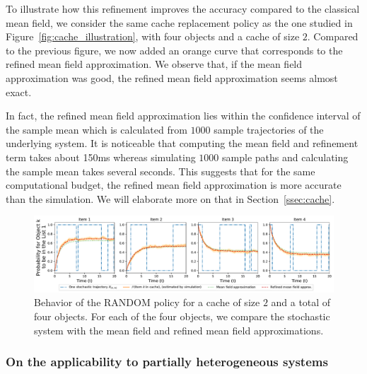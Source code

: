\documentclass[acmsmall]{acmart}
\begin{document}
To illustrate how this refinement improves the accuracy compared to the classical mean field, we consider the same cache replacement policy as the one studied in Figure~\ref{fig:cache_illustration}, with four objects and a cache of size $2$. Compared to the previous figure, we now added an orange curve that corresponds to the refined mean field approximation. We observe that, if the mean field approximation was good, the refined mean field approximation seems almost exact. 

In fact, the refined mean field approximation lies within the confidence interval of the sample mean which is calculated from $1000$ sample trajectories of the underlying system. It is noticeable that computing the mean field and refinement term takes about 150ms whereas simulating $1000$ sample paths and calculating the sample mean takes several seconds. 
This suggests that for the same computational budget, the refined mean field approximation is more accurate than the simulation. We will elaborate more on that in Section~\ref{ssec:cache}. 

\begin{figure}[ht]
  \centering
  \includegraphics[width=\linewidth]{probability_cache_single_rmf}
  \caption{Behavior of the RANDOM policy for a cache of size $2$ and a total of four objects. For each of the four objects, we compare the stochastic system with the mean field and refined mean field approximations. }
  \label{fig:cache_illustration_rmf}
\end{figure}


\subsubsection*{On the applicability to partially heterogeneous systems}
\end{document}
